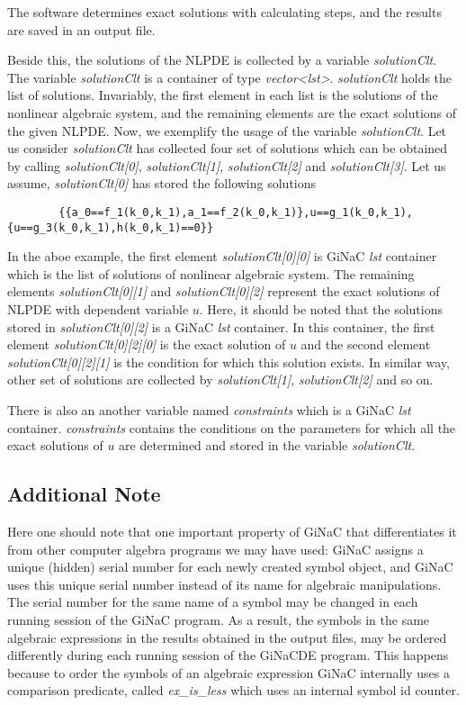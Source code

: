 \documentclass[prd,aps,floats,showkeys,nofootinbib,notitlepage]{revtex4}
\begin{document}
	\par The software determines exact solutions with calculating steps, and the results are saved in an output file.
	
	Beside this, the solutions of the NLPDE is collected by a variable {\em solutionClt}. The variable {\em solutionClt} is a container of type {\em vector<lst>}.
	{\em solutionClt} holds the list of solutions. Invariably, the first element in each list is the solutions of the nonlinear algebraic system, and the remaining elements are the exact solutions of the given NLPDE.
	Now, we exemplify the usage of the variable {\em solutionClt}. Let us consider {\em solutionClt} has collected four set of solutions which can be obtained by calling {\em solutionClt[0]}, {\em solutionClt[1]}, {\em solutionClt[2]} and {\em solutionClt[3]}. Let us assume, {\em solutionClt[0]} has stored the following solutions
	\begin{verbatim}
		{{a_0==f_1(k_0,k_1),a_1==f_2(k_0,k_1)},u==g_1(k_0,k_1),{u==g_3(k_0,k_1),h(k_0,k_1)==0}}
	\end{verbatim}
	In the aboe example, the first element {\em solutionClt[0][0]} is GiNaC {\em lst} container which is the list of solutions of nonlinear algebraic system. The remaining elements {\em solutionClt[0][1]} and {\em solutionClt[0][2]} represent the exact solutions of NLPDE with dependent variable $u$. Here, it should be noted that the solutions stored in {\em solutionClt[0][2]} is a GiNaC {\em lst} container. In this container, the first element {\em solutionClt[0][2][0]} is the exact solution of $u$ and the second element {\em solutionClt[0][2][1]} is the condition for which this solution exists.
	In similar way, other set of solutions are collected by {\em solutionClt[1]}, {\em solutionClt[2]} and so on.
	
	There is also an another variable named {\em constraints} which is a GiNaC {\em lst} container. {\em constraints} contains the conditions on the parameters for which all the exact solutions of $u$ are determined and stored in the variable {\em solutionClt}.
	
	\subsection{Additional Note}
	Here one should note that one important property of GiNaC that differentiates it from other computer algebra programs we may have used: GiNaC assigns a unique (hidden) serial number for each newly created symbol object, and GiNaC uses this unique serial number instead of its name for algebraic manipulations. The serial number for the same name of a symbol may be changed in each running session of the GiNaC program. As a result, the symbols in the same algebraic expressions in the results obtained in the output files, may be ordered differently during each running session of the GiNaCDE program. This happens because to order the symbols of an algebraic expression GiNaC internally uses a comparison predicate, called {\em ex\_is\_less} which uses an internal symbol id counter.	
\end{document}
